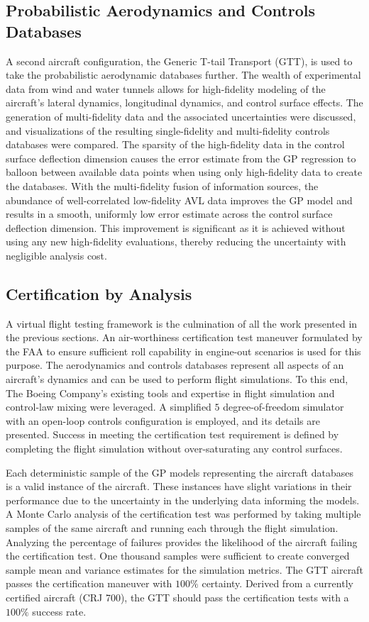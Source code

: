 \subsection{Probabilistic Aerodynamics and Controls Databases}
A second aircraft configuration, the Generic T-tail Transport (GTT), is used to take the probabilistic aerodynamic databases further.
The wealth of experimental data from wind and water tunnels allows for high-fidelity modeling of the aircraft's lateral dynamics, longitudinal dynamics, and control surface effects.
The generation of multi-fidelity data and the associated uncertainties were discussed, and visualizations of the resulting single-fidelity and multi-fidelity controls databases were compared.
The sparsity of the high-fidelity data in the control surface deflection dimension causes the error estimate from the GP regression to balloon between available data points when using only high-fidelity data to create the databases.
With the multi-fidelity fusion of information sources, the abundance of well-correlated low-fidelity AVL data improves the GP model and results in a smooth, uniformly low error estimate across the control surface deflection dimension. 
This improvement is significant as it is achieved without using any new high-fidelity evaluations, thereby reducing the uncertainty with negligible analysis cost. 

\subsection{Certification by Analysis}
A virtual flight testing framework is the culmination of all the work presented in the previous sections. 
An air-worthiness certification test maneuver formulated by the FAA \cite{romanowski_flight_2018} to ensure sufficient roll capability in engine-out scenarios is used for this purpose.
The aerodynamics and controls databases represent all aspects of an aircraft's dynamics and can be used to perform flight simulations.
To this end, The Boeing Company's existing tools and expertise in flight simulation and control-law mixing \cite{control_law_patent} were leveraged.
A simplified $5$ degree-of-freedom simulator with an open-loop controls configuration is employed, and its details are presented. 
Success in meeting the certification test requirement is defined by completing the flight simulation without over-saturating any control surfaces.

Each deterministic sample of the GP models representing the aircraft databases is a valid instance of the aircraft. 
These instances have slight variations in their performance due to the uncertainty in the underlying data informing the models.
A Monte Carlo analysis of the certification test was performed by taking multiple samples of the same aircraft and running each through the flight simulation. 
Analyzing the percentage of failures provides the likelihood of the aircraft failing the certification test.
One thousand samples were sufficient to create converged sample mean and variance estimates for the simulation metrics. 
The GTT aircraft passes the certification maneuver with $100\%$ certainty.
Derived from a currently certified aircraft (CRJ 700), the GTT should pass the certification tests with a $100\%$  success rate. 


